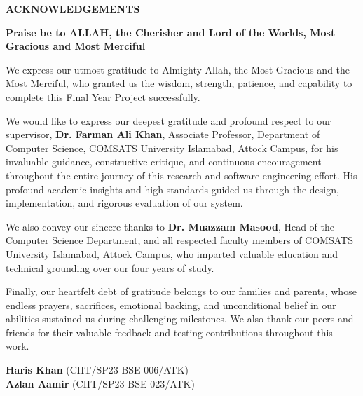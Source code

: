 \documentclass[A4paper,12pt]{report}
\theoremstyle{plain}
\theoremstyle{definition}
\theoremstyle{remark}
\numberwithin{equation}{section}
\begin{document}
\newpage
\begin{center}
\Large\textbf{{ACKNOWLEDGEMENTS}}
\end{center}
\begin{center}
\textbf{Praise be to ALLAH, the Cherisher and Lord of the Worlds, Most Gracious and Most Merciful}
\end{center}
\justify\noindent \normalsize{We express our utmost gratitude to Almighty Allah, the Most Gracious and the Most Merciful, who granted us the wisdom, strength, patience, and capability to complete this Final Year Project successfully.

We would like to express our deepest gratitude and profound respect to our supervisor, \textbf{Dr. Farman Ali Khan}, Associate Professor, Department of Computer Science, COMSATS University Islamabad, Attock Campus, for his invaluable guidance, constructive critique, and continuous encouragement throughout the entire journey of this research and software engineering effort. His profound academic insights and high standards guided us through the design, implementation, and rigorous evaluation of our system.

We also convey our sincere thanks to \textbf{Dr. Muazzam Masood}, Head of the Computer Science Department, and all respected faculty members of COMSATS University Islamabad, Attock Campus, who imparted valuable education and technical grounding over our four years of study. 

Finally, our heartfelt debt of gratitude belongs to our families and parents, whose endless prayers, sacrifices, emotional backing, and unconditional belief in our abilities sustained us during challenging milestones. We also thank our peers and friends for their valuable feedback and testing contributions throughout this work.
}

\begin{flushright}
\vspace{0.4in}
\textbf{Haris Khan} \quad (CIIT/SP23-BSE-006/ATK) \\[0.1in]
\textbf{Azlan Aamir} \quad (CIIT/SP23-BSE-023/ATK)
\end{flushright}
\end{document}
